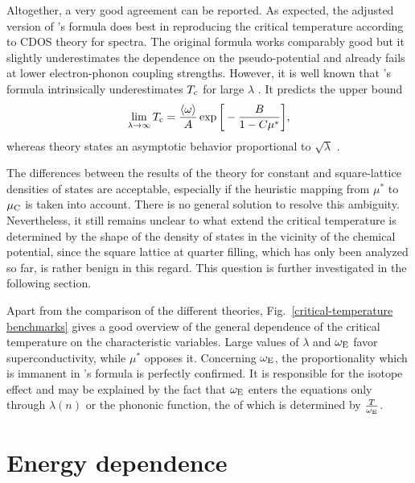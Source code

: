 Altogether, a very good agreement can be reported. As expected, the adjusted
version of 's formula does best in reproducing the critical
temperature according to CDOS  theory for 
spectra. The original formula works comparably good but it slightly
underestimates the dependence on the  pseudo-potential and already
fails at lower electron-phonon coupling strengths. However, it is well known
that 's formula intrinsically underestimates $T \sb{\text{c}}$ for large
$\lambda$ \cite{AllenDynes75}. It predicts the upper bound
%
\begin{equation*}
    \lim_{\lambda \rightarrow \infty} T \sb{\text{c}} = \frac {\langle\omega\rangle} A
    \exp \bigg[ -\frac B {1 - C \mu^*} \bigg],
\end{equation*}
%
whereas  theory states an asymptotic behavior proportional to
$\sqrt \lambda$ \cite[Eq.~3.56]{Galasso05}.

The differences between the results of the  theory for constant
and square-lattice densities of states are acceptable, especially if the
heuristic mapping from $\mu^*$ to $\mu \sb{\text{C}}$ is taken into account. There is
no general solution to resolve this ambiguity. Nevertheless, it still remains
unclear to what extend the critical temperature is determined by the shape of
the density of states in the vicinity of the chemical potential, since the
square lattice at quarter filling, which has only been analyzed so far, is
rather benign in this regard. This question is further investigated in the
following section.

Apart from the comparison of the different theories,
Fig.~\ref{critical-temperature benchmarks} gives a good overview of the general
dependence of the critical temperature on the characteristic variables. Large
values of $\lambda$ and $\omega \sb{\text{E}}$ favor superconductivity, while $\mu^*$
opposes it. Concerning $\omega \sb{\text{E}}$, the proportionality which is immanent in
's formula is perfectly confirmed. It is responsible for the
isotope effect and may be explained by the fact that $\omega \sb{\text{E}}$ enters the
 equations only through $\lambda(n)$ or the phononic
 function, the  of which is determined by $\frac T
{\omega \sb{\text{E}}}$.

\section{Energy dependence}

